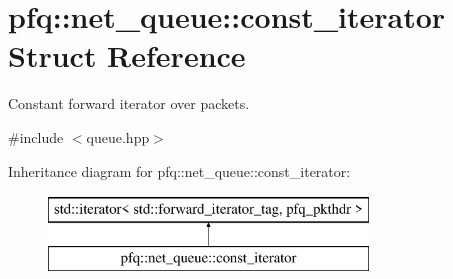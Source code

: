 \hypertarget{structpfq_1_1net__queue_1_1const__iterator}{}\section{pfq\+:\+:net\+\_\+queue\+:\+:const\+\_\+iterator Struct Reference}
\label{structpfq_1_1net__queue_1_1const__iterator}


Constant forward iterator over packets.  




{\ttfamily \#include $<$queue.\+hpp$>$}

Inheritance diagram for pfq\+:\+:net\+\_\+queue\+:\+:const\+\_\+iterator\+:\begin{figure}[H]
\begin{center}
\leavevmode
\includegraphics[height=2.000000cm]{structpfq_1_1net__queue_1_1const__iterator}
\end{center}
\end{figure}
